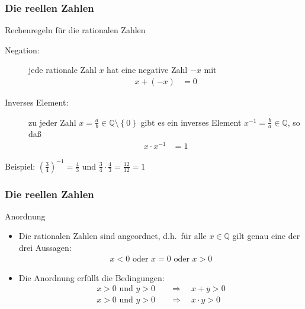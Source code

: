 \documentclass{beamer}
\newcommand\QQ{\mathbb Q}
\newcommand\bc[1]{\left({#1}\right)}
\newcommand\cbc[1]{\left\{{#1}\right\}}
\newcommand{\ue}{\"u}
\newcommand{\mytitle}{Die reellen Zahlen}
\begin{document}
\begin{frame}\frametitle{\mytitle}
	\begin{block}{Rechenregeln f\ue r die rationalen Zahlen}
		\begin{description}
			\item[Negation:] jede rationale Zahl $x$ hat eine negative Zahl $-x$ mit
					\begin{align*}
						x+(-x)&=0
					\end{align*}
			\item[Inverses Element:]	
				zu jeder Zahl $x=\frac{a}{b}\in\QQ\setminus\cbc 0$ gibt es ein inverses Element $x^{-1}=\frac{b}{a}\in\QQ$, so da\ss\
				\begin{align*}
					x\cdot x^{-1}&=1
				\end{align*}
		\end{description}
		\alert{Beispiel:} $\bc{\frac{3}{4}}^{-1}=\frac{4}{3}$ und $\frac{3}{4}\cdot\frac{4}{3}=\frac{12}{12}=1$
	\end{block}
\end{frame}

\begin{frame}\frametitle{\mytitle}
	\begin{block}{Anordnung}
	\begin{itemize}
	\item Die rationalen Zahlen sind angeordnet, d.h.\ f\ue r alle $x\in\QQ$ gilt genau eine der drei Aussagen:
		\begin{align*}
			x<0\mbox{ oder }x=0\mbox{ oder }x>0
		\end{align*}
	\item Die Anordnung erf\ue llt die Bedingungen:
		\begin{align*}
			x>0\mbox{ und }y>0\quad&\Rightarrow\quad x+y>0\\
			x>0\mbox{ und }y>0\quad&\Rightarrow\quad x\cdot y>0
		\end{align*}
	\end{itemize}
	\end{block}
\end{frame}
\end{document}
